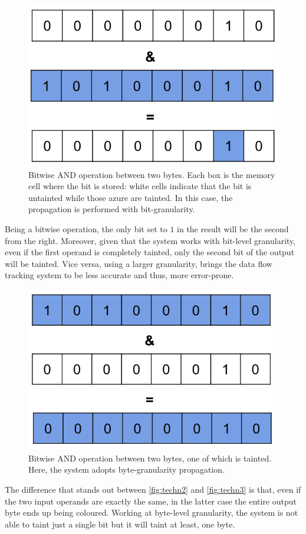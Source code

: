 \documentclass[LaM,binding=0.6cm]{sapthesis}
\begin{document}
\begin{figure}[h!]
\centering
\includegraphics[scale=.4]{images/techn2}
\caption{Bitwise AND operation between two bytes. Each box is the memory cell where the bit is stored: white cells indicate that the bit is untainted while those azure are tainted. In this case, the propagation is performed with bit-granularity.}
\label{fig:techn2}
\end{figure}

\noindent
Being a bitwise operation, the only bit set to $1$ in the result will be the second from the right. Moreover, given that the system works with bit-level granularity, even if the first operand is completely tainted, only the second bit of the output will be tainted. Vice versa, using a larger granularity, brings the data flow tracking system to be less accurate and thus, more error-prone.

\begin{figure}[h!]
\centering
\includegraphics[scale=.5]{images/techn3}
\caption{Bitwise AND operation between two bytes, one of which is tainted. Here, the system adopts byte-granularity propagation.}
\label{fig:techn3}
\end{figure}
\newpage
\noindent
The difference that stands out between \autoref{fig:techn2} and \autoref{fig:techn3} is that, even if the two input operands are exactly the same, in the latter case the entire output byte ends up being coloured. Working at byte-level granularity, the system is not able to taint just a single bit but it will taint at least, one byte.
\end{document}
